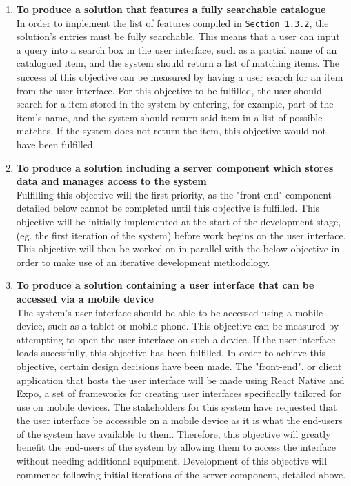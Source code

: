 \documentclass[../../../main.tex]{subfiles}
\begin{document}
\begin{enumerate}
      \item \textbf{To produce a solution that features a fully searchable catalogue}\\
            In order to implement the list of features compiled in \lstinline{Section 1.3.2}, the solution's entries
            must be fully searchable. This means that a user can input a query into a search box in the user interface,
            such as a partial name of an catalogued item, and the system should return a list of matching items.
            The success of this objective can be measured by having a user search for an item from the user interface.
            For this objective to be fulfilled, the user should search for a item stored in the system by entering,
            for example, part of the item's name, and the system should return said item in a list of possible
            matches. If the system does not return the item, this objective would not have been fulfilled.

      \item \textbf{To produce a solution including a server component which stores data and manages access to the system}\\
            Fulfilling this objective will the first priority, as the "front-end" component detailed below cannot be completed
            until this objective is fulfilled. This objective will be initially implemented at the start of the development
            stage, (eg. the first iteration of the system) before work begins on the user interface. This objective will then
            be worked on in parallel with the below objective in order to make use of an iterative development methodology.

      \item \textbf{To produce a solution containing a user interface that can be accessed via a mobile device}\\
            The system's user interface should be able to be accessed using a mobile device, such as a tablet
            or mobile phone. This objective can be measured by attempting to open the user interface on such a device.
            If the user interface loads sucessfully, this objective has been fulfilled. In order to achieve this objective,
            certain design decisions have been made. The "front-end", or client application that hosts the user interface
            will be made using React Native and Expo, a set of frameworks for creating user interfaces specifically
            tailored for use on mobile devices. The stakeholders for this system have requested that the user interface
            be accessible on a mobile device as it is what the end-users of the system have available to them.
            Therefore, this objective will greatly benefit the end-users of the system by allowing them to access the interface
            without needing additional equipment. Development of this objective will commence following initial
            iterations of the server component, detailed above.


\end{enumerate}
\end{document}

